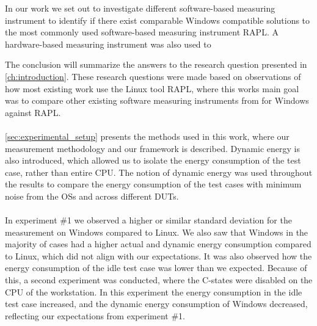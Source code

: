 In our work we set out to investigate different software-based measuring instrument to identify if there exist comparable Windows compatible solutions to the most commonly used software-based measuring instrument RAPL. A hardware-based measuring instrument was also used to 

The conclusion will summarize the answers to the research question presented in \cref{ch:introduction}. These research questions were made based on observations of how most existing work use the Linux tool RAPL, where this works main goal was to compare other existing software measuring instruments from for Windows against RAPL. 



\paragraph*{}
\cref{sec:experimental_setup} presents the methods used in this work, where our measurement methodology and our framework is described. Dynamic energy is also introduced, which allowed us to isolate the energy consumption of the test case, rather than entire CPU. The notion of dynamic energy was used throughout the results to compare the energy consumption of the test cases with minimum noise from the OSs and across different DUTs. 

\paragraph*{}
In experiment \#1 we observed a higher or similar standard deviation for the measurement on Windows compared to Linux. We also saw that Windows in the majority of cases had a higher actual and dynamic energy consumption compared to Linux, which did not align with our expectations. It was also observed how the energy consumption of the idle test case was lower than we expected. Because of this, a second experiment was conducted, where the C-states were disabled on the CPU of the workstation. In this experiment the energy consumption in the idle test case increased, and the dynamic energy consumption of Windows decreased, reflecting our expectations from experiment \#1.

